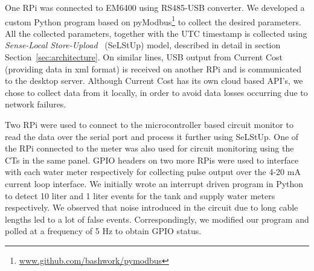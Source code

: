 \documentclass[10pt]{sensys-proc}
\newcommand{\secref}[1]{Section~\ref{#1}}
\newcommand{\tabref}[1]{Table~\ref{#1}}
\newcommand{\paradigm}{Sense-Local Store-Upload}
\newcommand{\selstup}{SeLStUp}
\newcommand{\paradigms}{Sense-Local Store-Upload~}
\begin{document}
One RPi was connected to EM6400 using RS485-USB converter. We developed a custom Python program based on pyModbus\footnote{\url{www.github.com/bashwork/pymodbus}} to collect the desired parameters. %
All the collected parameters, together with the UTC timestamp is %
collected using \emph{\paradigms} (\selstup) model, described in detail in section \secref{sec:architecture}. On similar lines, USB output from Current Cost (providing data in xml format) is received on another RPi and is communicated to the desktop server. %
Although Current Cost has its own cloud based API's, we chose to collect data from it locally, in order to avoid data losses occurring due to network failures. 


Two RPi were used to connect to the microcontroller based circuit monitor to read the data over the serial port and process it further using \selstup. One of the RPi connected to the meter was also used for circuit monitoring using the CTs in the same panel. GPIO headers on two more RPis were used to interface with each water meter respectively for collecting pulse output over the 4-20 mA current loop interface. We initially wrote an interrupt driven program in Python to detect 10 liter and 1 liter events for the tank and supply water meters respectively. We observed that noise introduced in the circuit due to long cable lengths led to a lot of false events. Correspondingly, we modified our program and polled at a frequency of 5 Hz to obtain GPIO status.%
\end{document}
